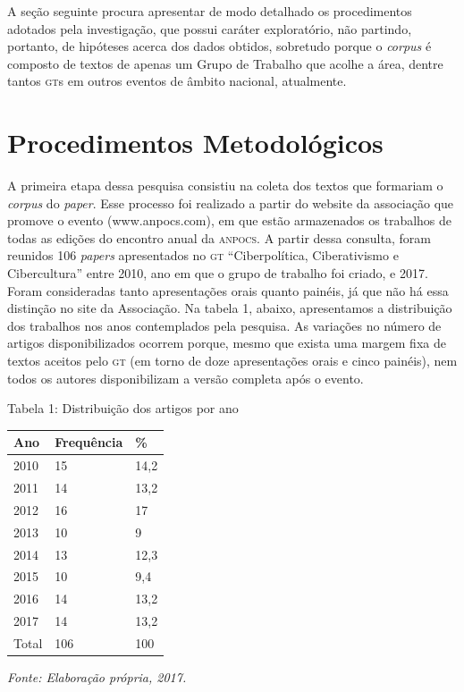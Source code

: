 A seção seguinte procura apresentar de modo detalhado os procedimentos
adotados pela investigação, que possui caráter exploratório, não
partindo, portanto, de hipóteses acerca dos dados obtidos, sobretudo
porque o \emph{corpus} é composto de textos de apenas um Grupo de
Trabalho que acolhe a área, dentre tantos \textsc{gt}s em outros eventos de
âmbito nacional, atualmente.

\section{Procedimentos Metodológicos}

A primeira etapa dessa pesquisa consistiu na coleta dos textos que
formariam o \emph{corpus} do \emph{paper}. Esse processo foi realizado a
partir do website da associação que promove o evento (www.anpocs.com),
em que estão armazenados os trabalhos de todas as edições do encontro
anual da \textsc{anpocs}. A partir dessa consulta, foram reunidos 106
\emph{papers} apresentados no \textsc{gt} ``Ciberpolítica, Ciberativismo e
Cibercultura'' entre 2010, ano em que o grupo de trabalho foi criado, e
2017. Foram consideradas tanto apresentações orais quanto painéis, já
que não há essa distinção no site da Associação. Na tabela 1, abaixo,
apresentamos a distribuição dos trabalhos nos anos contemplados pela
pesquisa. As variações no número de artigos disponibilizados ocorrem
porque, mesmo que exista uma margem fixa de textos aceitos pelo \textsc{gt} (em
torno de doze apresentações orais e cinco painéis), nem todos os
autores disponibilizam a versão completa após o evento.

\begin{center}
Tabela 1: Distribuição dos artigos por ano
\end{center}

\begin{center}
\centering
\begin{tabular}{|l|l|l|}
\hline
Ano & Frequência & \% \\ \hline
2010 & 15 & 14,2 \\ \hline
2011 & 14 & 13,2 \\ \hline
2012 & 16 & 17 \\ \hline
2013 & 10 & 9 \\ \hline
2014 & 13 & 12,3 \\ \hline
2015 & 10 & 9,4 \\ \hline
2016 & 14 & 13,2 \\ \hline
2017 & 14 & 13,2 \\ \hline
Total & 106 & 100 \\ \hline
\end{tabular}
\end{center}
\begin{center}
{\footnotesize\emph{Fonte: Elaboração própria, 2017.}}
\end{center}

